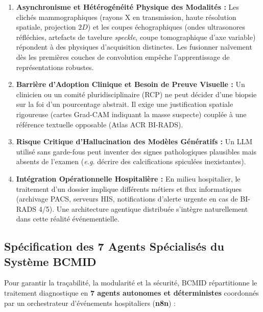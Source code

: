 \documentclass[11pt,a4paper]{article}
\begin{document}
\begin{enumerate}
    \item \textbf{Asynchronisme et Hétérogénéité Physique des Modalités :} Les clichés mammographiques (rayons X en transmission, haute r\'esolution spatiale, projection $2D$) et les coupes \'echographiques (ondes ultrasonores r\'efl\'echies, artefacts de tavelure \textit{speckle}, coupe tomographique d'axe variable) r\'epondent \`a des physiques d'acquisition distinctes. Les fusionner na\^ivement d\`es les premi\`eres couches de convolution emp\^eche l'apprentissage de repr\'esentations robustes.
    \item \textbf{Barrière d'Adoption Clinique et Besoin de Preuve Visuelle :} Un clinicien ou un comit\'e pluridisciplinaire (RCP) ne peut d\'ecider d'une biopsie sur la foi d'un pourcentage abstrait. Il exige une justification spatiale rigoureuse (cartes Grad-CAM indiquant la masse suspecte) coupl\'ee \`a une r\'ef\'erence textuelle opposable (Atlas ACR BI-RADS).
    \item \textbf{Risque Critique d'Hallucination des Modèles Génératifs :} Un LLM utilis\'e sans garde-fous peut inventer des signes pathologiques plausibles mais absents de l'examen (\textit{e.g.} d\'ecrire des calcifications spicul\'ees inexistantes).
    \item \textbf{Intégration Opérationnelle Hospitalière :} En milieu hospitalier, le traitement d'un dossier implique diff\'erents m\'etiers et flux informatiques (archivage PACS, serveurs HIS, notifications d'alerte urgente en cas de BI-RADS 4/5). Une architecture agentique distribu\'ee s'int\`egre naturellement dans cette r\'ealit\'e \'ev\'enementielle.
\end{enumerate}

\subsection{Spécification des 7 Agents Spécialisés du Système BCMID}
Pour garantir la tra\c{c}abilit\'e, la modularit\'e et la s\'ecurit\'e, BCMID r\'epartitionne le traitement diagnostique en \textbf{7 agents autonomes et d\'eterministes} coordonn\'es par un orchestrateur d'\'ev\'enements hospitaliers (\textbf{n8n}) :
\end{document}
